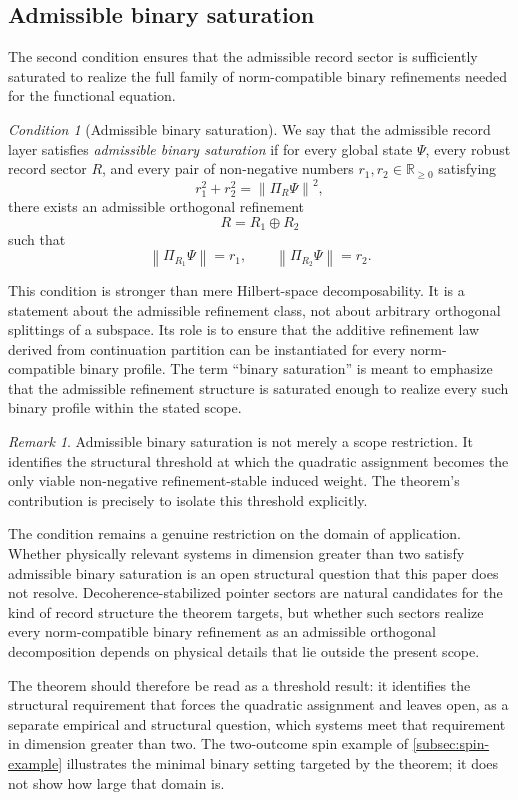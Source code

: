 \documentclass[11pt]{article}
\theoremstyle{remark}
\newtheorem{remark}{Remark}
\newtheorem{condition}[theorem]{Condition}
\numberwithin{equation}{section}
\newcommand{\RR}{\mathbb{R}}
\newcommand{\Proj}[1]{\Pi_{#1}}
\newcommand{\norm}[1]{\left\lVert #1 \right\rVert}
\begin{document}
\subsection{Admissible binary saturation}

The second condition ensures that the admissible record sector is sufficiently saturated to realize the full family of norm-compatible binary refinements needed for the functional equation.

\begin{condition}[Admissible binary saturation]
\label{cond:binary-saturation}
We say that the admissible record layer satisfies \emph{admissible binary saturation} if for every global state $\Psi$, every robust record sector $R$, and every pair of non-negative numbers $r_1,r_2 \in \RR_{\geq 0}$ satisfying
\[
r_1^2 + r_2^2 = \norm{\Proj{R}\Psi}^2,
\]
there exists an admissible orthogonal refinement
\[
R = R_1 \oplus R_2
\]
such that
\[
\norm{\Proj{R_1}\Psi} = r_1,
\qquad
\norm{\Proj{R_2}\Psi} = r_2.
\]
\end{condition}

This condition is stronger than mere Hilbert-space decomposability. It is a statement about the admissible refinement class, not about arbitrary orthogonal splittings of a subspace. Its role is to ensure that the additive refinement law derived from continuation partition can be instantiated for every norm-compatible binary profile. The term ``binary saturation'' is meant to emphasize that the admissible refinement structure is saturated enough to realize every such binary profile within the stated scope.

\begin{remark}
Admissible binary saturation is not merely a scope restriction. It
identifies the structural threshold at which the quadratic assignment
becomes the only viable non-negative refinement-stable induced weight.
The theorem's contribution is precisely to isolate this threshold
explicitly.

The condition remains a genuine restriction on the domain of
application. Whether physically relevant systems in dimension greater
than two satisfy admissible binary saturation is an open structural
question that this paper does not resolve. Decoherence-stabilized
pointer sectors are natural candidates for the kind of record
structure the theorem targets, but whether such sectors realize every
norm-compatible binary refinement as an admissible orthogonal
decomposition depends on physical details that lie outside the present
scope.

The theorem should therefore be read as a threshold result: it
identifies the structural requirement that forces the quadratic
assignment and leaves open, as a separate empirical and structural
question, which systems meet that requirement in dimension greater
than two. The two-outcome spin example of
\cref{subsec:spin-example} illustrates the minimal binary setting
targeted by the theorem; it does not show how large that domain is.
\end{remark}
\end{document}
